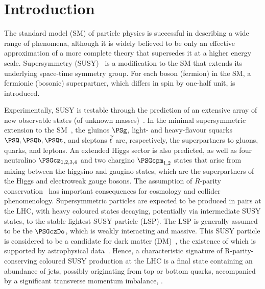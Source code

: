 \section{Introduction}
\label{sec:introduction}

The standard model (SM) of particle physics is successful in
describing a wide range of phenomena, although it is widely believed
to be only an effective approximation of a more complete theory that
supersedes it at a higher energy scale. Supersymmetry
(SUSY)~\cite{ref:SUSY-1, ref:SUSY0, ref:SUSY3, ref:SUSY1} is a
modification to the SM that extends its underlying space-time symmetry
group. For each boson (fermion) in the SM, a fermionic (bosonic)
superpartner, which differs in spin by one-half unit, is introduced.

Experimentally, SUSY is testable through the prediction of an
extensive array of new observable states (of unknown
masses)~\cite{ref:SUSY4, ref:SUSY2}. In the minimal supersymmetric
extension to the SM~\cite{ref:SUSY2}, the gluinos $\PSg$, light- and
heavy-flavour squarks $\PSQ, \PSQb, \PSQt$, and sleptons $\widetilde{\ell}$ are,
respectively, the superpartners to gluons, quarks, and leptons. An
extended Higgs sector is also predicted, as well as four neutralino
$\PSGcz_{1,2,3,4}$ and two chargino $\PSGcpm_{1,2}$ states that arise
from mixing between the higgsino and gaugino states, which are the
superpartners of the Higgs and electroweak gauge bosons.  The
assumption of $R$-parity conservation~\cite{Farrar:1978xj} has
important consequences for cosmology and collider
phenomenology. Supersymmetric particles are expected to be produced in
pairs at the LHC, with heavy coloured states decaying, potentially via
intermediate SUSY states, to the stable lightest SUSY particle
(LSP). The LSP is generally assumed to be the $\PSGczDo$, which is
weakly interacting and massive. This SUSY particle is considered to be
a candidate for dark matter (DM)~\cite{Jungman:1995df}, the existence
of which is supported by astrophysical
data~\cite{1674-1137-38-9-090001}.  Hence, a characteristic signature
of R-parity-conserving coloured SUSY production at the LHC is a final
state containing an abundance of jets, possibly originating from top
or bottom quarks, accompanied by a significant transverse momentum
imbalance, \ptvecmiss.

